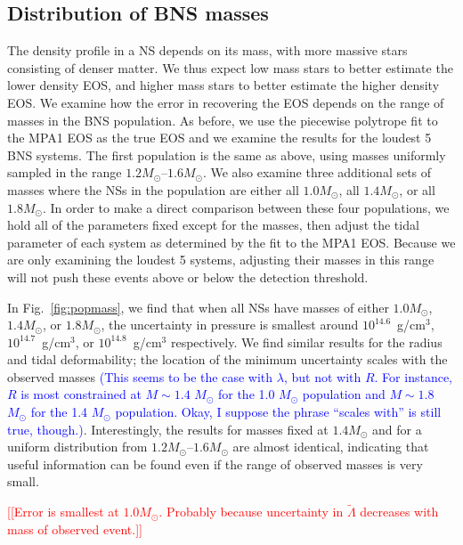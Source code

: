 \documentclass[twocolumn,prd,amssymb,aps,nofootinbib,showpacs,epsf]{revtex4}
\newcommand{\red}{\textcolor{red}}
\newcommand\les[2]{\textcolor{blue}{{#1}\sout{#2}}}
\begin{document}
\subsection{Distribution of BNS masses}
\label{sec:varymass}

The density profile in a NS depends on its mass, with more massive stars consisting of denser matter. We thus expect low mass stars to better estimate the lower density EOS, and higher mass stars to better estimate the higher density EOS. We examine how the error in recovering the EOS depends on the range of masses in the BNS population. As before, we use the piecewise polytrope fit to the MPA1 EOS as the true EOS and we examine the results for the loudest 5 BNS systems. The first population is the same as above, using masses uniformly sampled in the range $1.2M_\odot$--$1.6M_\odot$. We also examine three additional sets of masses where the NSs in the population are either all $1.0M_\odot$, all $1.4M_\odot$, or all $1.8M_\odot$. In order to make a direct comparison between these four populations, we hold all of the parameters fixed except for the masses, then adjust the tidal parameter of each system as determined by the fit to the MPA1 EOS. Because we are only examining the loudest 5 systems, adjusting their masses in this range will not push these events above or below the detection threshold. 

In Fig.~\ref{fig:popmass}, we find that when all NSs have masses of either $1.0M_\odot$, $1.4M_\odot$, or $1.8M_\odot$, the uncertainty in pressure is smallest around $10^{14.6}$~g/cm$^3$, $10^{14.7}$~g/cm$^3$, or $10^{14.8}$~g/cm$^3$ respectively. We find similar results for the radius and tidal deformability; the location of the minimum uncertainty scales with the observed masses \les{(This seems to be the case with $\lambda$, but not with $R$.  For instance, $R$ is most constrained at $M\sim1.4$ $M_\odot$ for the 1.0 $M_\odot$ population and $M\sim1.8$ $M_\odot$ for the 1.4 $M_\odot$ population.  Okay, I suppose the phrase ``scales with'' is still true, though.)}{}. Interestingly, the results for masses fixed at $1.4M_\odot$ and for a uniform distribution from $1.2M_\odot$--$1.6M_\odot$ are almost identical, indicating that useful information can be found even if the range of observed masses is very small.

\red{[[Error is smallest at $1.0M_\odot$. Probably because uncertainty in $\tilde\Lambda$ decreases with mass of observed event.]]} 
\end{document}
